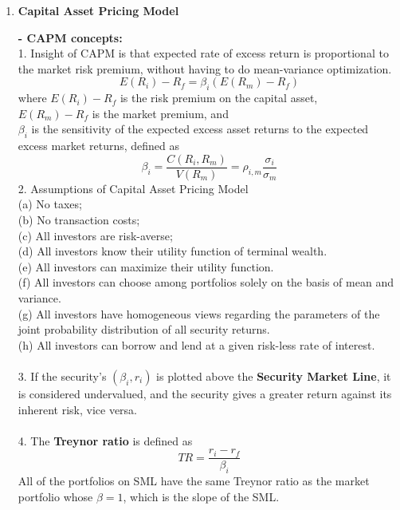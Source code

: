 \documentclass{article}
\begin{document}
\begin{enumerate}[S1 - ]
    \item \textbf{Capital Asset Pricing Model}\\\par
    \textbf{- CAPM concepts:}\\
    1. Insight of CAPM is that expected rate of excess return is proportional to the market risk
    premium, without having to do mean-variance optimization.
    \begin{equation*}
    E(R_i)-R_f = \beta_i(E(R_m)-R_f)
    \end{equation*}
    where $E(R_i)-R_f$ is the risk premium on the capital asset,\\
    $E(R_m)-R_f$ is the market premium, and\\
    $\beta_i$ is the sensitivity of the expected excess asset returns to the expected excess market returns, defined as
    \begin{equation*}
    \beta_i = \frac{C(R_i,R_m)}{V(R_m)} = \rho_{i,m}\frac{\sigma_i}{\sigma_m}
    \end{equation*}
    2. Assumptions of Capital Asset Pricing Model\\
    (a) No taxes;\\
    (b) No transaction costs;\\
    (c) All investors are risk-averse;\\
    (d) All investors know their utility function of terminal wealth.\\
    (e) All investors can maximize their utility function.\\
    (f) All investors can choose among portfolios solely on the basis of mean and variance.\\
    (g) All investors have homogeneous views regarding the parameters of the joint probability distribution of all security returns.\\
    (h) All investors can borrow and lend at a given risk-less rate of interest.\\
    \\
    3. If the security's $(\beta_i,r_i)$ is plotted above the \textbf{Security Market Line}, it is considered undervalued, and the security gives a greater return against its inherent risk, vice versa.\\
    \\
    4. The \textbf{Treynor ratio} is defined as
    \begin{equation*}
    TR = \frac{r_i-r_f}{\beta_i}
    \end{equation*}
    All of the portfolios on SML have the same Treynor ratio as the market portfolio whose $\beta = 1$, which is the slope of the SML.\\

\end{enumerate}
\end{document}
